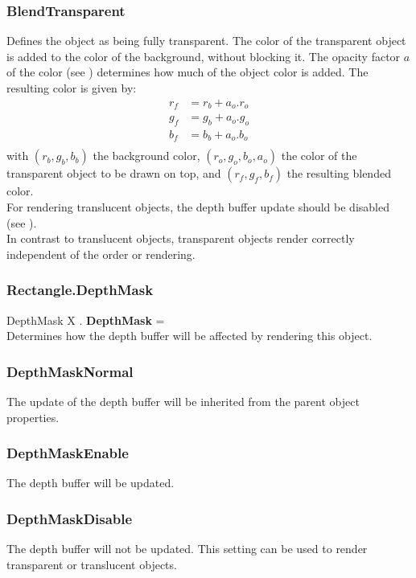 \subsubsection{BlendTransparent \label{T:BlendType|BlendTransparent}}
Defines the object as being fully transparent. The color of the transparent object is added to the color of the background, without blocking it. The opacity factor $a$ of the color (see ) determines how much of the object color is added. The resulting color is given by:
\begin{equation}
\begin{array}{rcl}
r_f & = r_b + a_o . r_o \\
g_f & = g_b + a_o . g_o \\
b_f & = b_b + a_o . b_o \\
\end{array}
\end{equation}
with $(r_b,g_b,b_b)$ the background color, $(r_o,g_o,b_o,a_o)$ the color of the transparent object to be drawn on top, and $(r_f,g_f,b_f)$ the resulting blended color. \\
For rendering translucent objects, the depth buffer update should be disabled (see ). \\
In contrast to translucent objects, transparent objects render correctly independent of the order or rendering.

\subsubsection{Rectangle.DepthMask \label{F:Rectangle:DepthMask}}
DepthMask X . \textbf{DepthMask} = \\
Determines how the depth buffer will be affected by rendering this object.

\subsubsection{DepthMaskNormal \label{T:DepthMask|DepthMaskNormal}}
The update of the depth buffer will be inherited from the parent object properties.

\subsubsection{DepthMaskEnable \label{T:DepthMask|DepthMaskEnable}}
The depth buffer will be updated.

\subsubsection{DepthMaskDisable \label{T:DepthMask|DepthMaskDisable}}
The depth buffer will not be updated. This setting can be used to render transparent or translucent objects.

